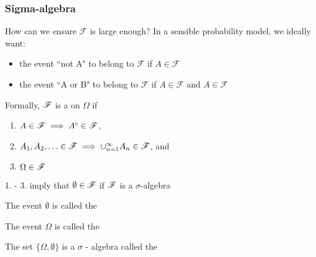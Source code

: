 \begin{frame}\frametitle{Sigma-algebra}

    \vspace{2em}
    How can we ensure $\mathscr{F}$ is large enough? In a sensible probability model, 
    we ideally want:
    \begin{itemize}
        \item the event ``not A" to belong to $\mathscr{F}$ if $A\in \mathscr{F}$
        \item the event ``A or B" to belong to $\mathscr{F}$ if $A\in \mathscr{F}$ 
                and $A\in \mathscr{F}$
    \end{itemize}
    
    \vspace{1em}
    Formally, $\mathscr F$ is a
     on $\Omega$ if
    \begin{enumerate}
        \item $A \in \mathscr F \implies A^c \in \mathscr F$,
        \item $A_1, A_2, \ldots \in \mathscr F \implies \cup_{n=1}^{\infty} A_n \in \mathscr F$,
            and
        \item $\Omega \in \mathscr F$
    \end{enumerate}
    
\end{frame}

\begin{frame}

    \vspace{2em}
    1. - 3. imply that $\emptyset \in \mathscr F$ if $\mathscr F$ is a $\sigma$-algebra
    
    The event $\emptyset$ is called the  
    
    The event $\Omega$ is called the 
    
    \vspace{1em}
    \Eg The set $\{\Omega, \emptyset\}$ is a $\sigma$ - algebra called 
    the 
    
\end{frame}

